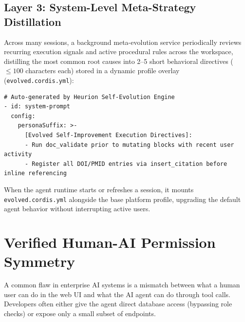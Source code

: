 \documentclass[11pt,a4paper]{article}
\begin{document}
\subsection{Layer 3: System-Level Meta-Strategy Distillation}
Across many sessions, a background meta-evolution service periodically reviews recurring execution signals and active procedural rules across the workspace, distilling the most common root causes into 2--5 short behavioral directives ($\le 100$ characters each) stored in a dynamic profile overlay (\texttt{evolved.cordis.yml}):

\begin{lstlisting}[style=heurionspec]
# Auto-generated by Heurion Self-Evolution Engine
- id: system-prompt
  config:
    personaSuffix: >-
      [Evolved Self-Improvement Execution Directives]:
      - Run doc_validate prior to mutating blocks with recent user activity
      - Register all DOI/PMID entries via insert_citation before inline referencing
\end{lstlisting}

When the agent runtime starts or refreshes a session, it mounts \texttt{evolved.cordis.yml} alongside the base platform profile, upgrading the default agent behavior without interrupting active users.

\section{Verified Human-AI Permission Symmetry}
\label{sec:parity}

A common flaw in enterprise AI systems is a mismatch between what a human user can do in the web UI and what the AI agent can do through tool calls. Developers often either give the agent direct database access (bypassing role checks) or expose only a small subset of endpoints.
\end{document}

